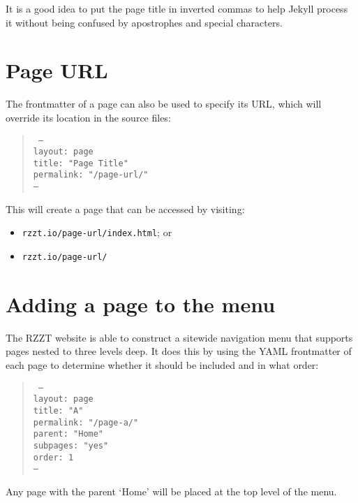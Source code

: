 It is a good idea to put the page title in inverted commas to help Jekyll process it without being confused by apostrophes and special characters.

\section{Page URL}

The frontmatter of a page can also be used to specify its URL, which will override its location in the source files:

\begin{quote}
  \texttt{%
    ---\\
    layout: page\\
    title: "Page Title"\\
    permalink: "/page-url/"\\
    ---
  }
\end{quote}

This will create a page that can be accessed by visiting:

\begin{itemize}
  \item \texttt{rzzt.io/page-url/index.html}; or
  \item \texttt{rzzt.io/page-url/}
\end{itemize}

\section{Adding a page to the menu}

The RZZT website is able to construct a sitewide navigation menu that supports pages nested to three levels deep. It does this by using the YAML frontmatter of each page to determine whether it should be included and in what order:

\begin{quote}
  \texttt{%
    ---\\
    layout: page\\
    title: "A"\\
    permalink: "/page-a/"\\
    parent: "Home"\\
    subpages: "yes"\\
    order: 1\\
    ---\\
  }
\end{quote}

Any page with the parent `Home' will be placed at the top level of the menu.

